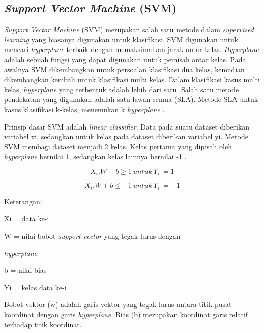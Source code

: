 \subsection{\textit{Support Vector Machine} (SVM)}
\textit{Support Vector Machine} (SVM) merupakan salah satu metode dalam \textit{supervised learning} yang biasanya digunakan untuk klasifikasi. SVM digunakan untuk mencari \textit{hyperplane} terbaik dengan memaksimalkan jarak antar kelas. \textit{Hyperplane} adalah sebuah fungsi yang dapat digunakan untuk pemisah antar kelas. Pada awalnya SVM dikembangkan untuk persoalan klasifikasi dua kelas, kemudian dikembangkan kembali untuk klasifikasi multi kelas. Dalam klasifikasi kasus multi kelas, \textit{hyperplane} yang terbentuk adalah lebih dari satu. Salah satu metode pendekatan yang digunakan adalah satu lawan semua (SLA). Metode SLA untuk kasus klasifikasi k-kelas, menemukan k \textit{hyperplane} \citep{Braun2011}.


\par Prinsip dasar SVM adalah \textit{linear classifier}. Data pada suatu dataset diberikan variabel xi, sedangkan untuk kelas pada dataset diberikan variabel yi. Metode SVM membagi dataset menjadi 2 kelas. Kelas pertama yang dipisah oleh \textit{hyperplane} bernilai 1, sedangkan kelas lainnya bernilai -1 \citep{Santos2021}.

\begin{equation}
	X_i.W + b \ge 1 \> untuk \> Y_i\>=1
\end{equation}

\begin{equation}
	X_i.W + b \le  -1 \> untuk \> Y_i\>=-1
\end{equation}

\par Keterangan:
\par Xi = data ke-i
\par W = nilai bobot \textit{support vector} yang tegak lurus dengan \par \textit{hyperplane}
\par b = nilai bias
\par Yi = kelas data ke-i

\par Bobot vektor (w) adalah garis vektor yang tegak lurus antara titik pusat koordinat dengan garis \textit{hyperplane}. Bias (b) merupakan koordinat garis relatif terhadap titik koordinat.



